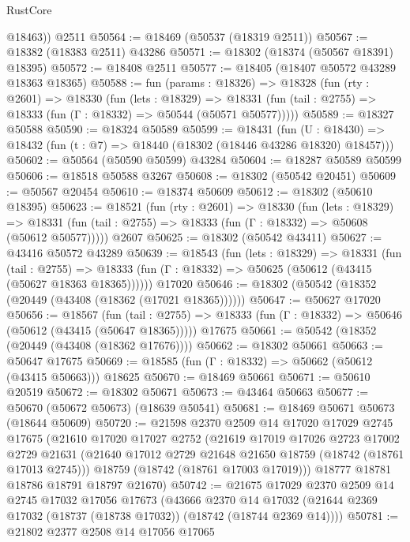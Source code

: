 \begin{lexlean}{RustCore}
\begin{coremodule}
        @18463))
    @2511
@50564 := @18469 (@50537 (@18319 @2511))
@50567 := @18382 (@18383 @2511) @43286
@50571 := @18302 (@18374 (@50567 @18391) @18395)
@50572 := @18408 @2511
@50577 := @18405 (@18407 @50572 @43289 @18363 @18365)
@50588 := fun (params : @18326) =>
  @18328
    (fun (rty : @2601) =>
    @18330
      (fun (lets : @18329) =>
      @18331 (fun (tail : @2755) => @18333 (fun (Γ : @18332) => @50544 (@50571 @50577)))))
@50589 := @18327 @50588
@50590 := @18324 @50589
@50599 := @18431
    (fun (U : @18430) => @18432 (fun (t : @7) => @18440 (@18302 (@18446 @43286 @18320) @18457)))
@50602 := @50564 (@50590 @50599) @43284
@50604 := @18287 @50589 @50599
@50606 := @18518 @50588 @3267
@50608 := @18302 (@50542 @20451)
@50609 := @50567 @20454
@50610 := @18374 @50609
@50612 := @18302 (@50610 @18395)
@50623 := @18521
    (fun (rty : @2601) =>
    @18330
      (fun (lets : @18329) =>
      @18331 (fun (tail : @2755) => @18333 (fun (Γ : @18332) => @50608 (@50612 @50577)))))
    @2607
@50625 := @18302 (@50542 @43411)
@50627 := @43416 @50572 @43289
@50639 := @18543
    (fun (lets : @18329) =>
    @18331
      (fun (tail : @2755) =>
      @18333 (fun (Γ : @18332) => @50625 (@50612 (@43415 (@50627 @18363 @18365))))))
    @17020
@50646 := @18302 (@50542 (@18352 (@20449 (@43408 (@18362 (@17021 @18365))))))
@50647 := @50627 @17020
@50656 := @18567
    (fun (tail : @2755) => @18333 (fun (Γ : @18332) => @50646 (@50612 (@43415 (@50647 @18365)))))
    @17675
@50661 := @50542 (@18352 (@20449 (@43408 (@18362 @17676))))
@50662 := @18302 @50661
@50663 := @50647 @17675
@50669 := @18585 (fun (Γ : @18332) => @50662 (@50612 (@43415 @50663))) @18625
@50670 := @18469 @50661
@50671 := @50610 @20519
@50672 := @18302 @50671
@50673 := @43464 @50663
@50677 := @50670 (@50672 @50673) (@18639 @50541)
@50681 := @18469 @50671 @50673 (@18644 @50609)
@50720 := @21598
    @2370
    @2509
    @14
    @17020
    @17029
    @2745
    @17675
    (@21610
      @17020
      @17027
      @2752
      (@21619
        @17019
        @17026
        @2723
        @17002
        @2729
        @21631
        (@21640 @17012 @2729 @21648 @21650 @18759 (@18742 (@18761 @17013 @2745)))
        @18759
        (@18742 (@18761 @17003 @17019)))
      @18777
      @18781
      @18786
      @18791
      @18797
      @21670)
@50742 := @21675
    @17029
    @2370
    @2509
    @14
    @2745
    @17032
    @17056
    @17673
    (@43666
      @2370
      @14
      @17032
      (@21644 @2369 @17032 (@18737 (@18738 @17032)) (@18742 (@18744 @2369 @14))))
@50781 := @21802
    @2377
    @2508
    @14
    @17056
    @17065

\end{coremodule}
\end{lexlean}
